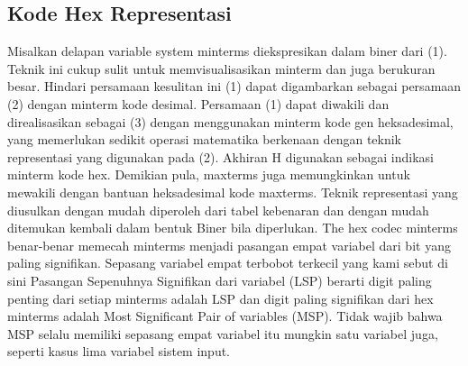 \subsection{Kode Hex Representasi}
Misalkan delapan variable system minterms diekspresikan dalam biner dari (1).
Teknik ini cukup sulit untuk memvisualisasikan minterm dan juga berukuran besar. Hindari persamaan kesulitan ini (1) dapat digambarkan sebagai persamaan 
(2) dengan minterm kode desimal.
Persamaan (1) dapat diwakili dan direalisasikan sebagai 
(3) dengan menggunakan minterm kode gen heksadesimal, yang memerlukan sedikit operasi matematika berkenaan dengan teknik representasi yang digunakan pada (2).
Akhiran H digunakan sebagai indikasi minterm kode hex.
Demikian pula, maxterms juga memungkinkan untuk mewakili dengan bantuan heksadesimal kode maxterms. Teknik representasi yang diusulkan dengan mudah diperoleh dari tabel kebenaran dan dengan mudah ditemukan kembali dalam bentuk Biner bila diperlukan.
The hex codec minterms benar-benar memecah minterms menjadi pasangan empat variabel dari bit yang paling signifikan. 
Sepasang variabel empat terbobot terkecil yang kami sebut di sini Pasangan Sepenuhnya Signifikan dari variabel (LSP) berarti digit paling penting dari setiap minterms adalah LSP dan digit paling signifikan dari hex minterms adalah Most Significant Pair of variables (MSP). 
Tidak wajib bahwa MSP selalu memiliki sepasang empat variabel itu mungkin satu variabel juga, seperti kasus lima variabel sistem input. 
